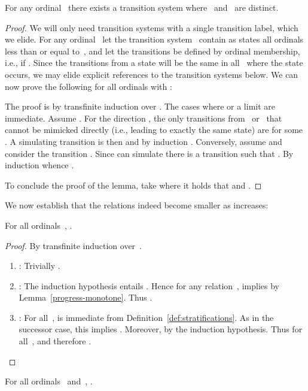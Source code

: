 \documentclass{CSML}
\theoremstyle{definition}
\begin{document}
\begin{lem}
\label{distinct-equivalences}
For any ordinal~ there exists a transition system
where~ and~ are distinct.
\end{lem}

\begin{proof}
We will only need transition systems with a single transition label,
which we elide.  For any ordinal~ let the transition
system~ contain as states all ordinals less than or equal
to~, and let the transitions be defined by ordinal membership,
i.e.,  if . Since the
transitions from a state will be the same in all~ where the
state occurs, we may elide explicit references to the transition
systems below.  We can now prove the following for all ordinals
 with :

The proof is by transfinite induction over .  The cases where
 or a limit are immediate. Assume . For the direction , the only transitions from~
or~ that cannot be mimicked directly (i.e., leading to exactly
the same state) are  for some .  A simulating transition is then  and by induction .
Conversely, assume  and consider the
transition .  Since  can
simulate there is a transition  such
that  . By induction  whence .

To conclude the proof of the lemma, take  where it holds
that  and .
\end{proof}

We now establish that the relations  indeed become
smaller as  increases:

\begin{lem}
\label{stratifications-successor}
For all ordinals~, .
\end{lem}

\begin{proof}
By transfinite induction over~.
\begin{enumerate}
\item : Trivially .
\item : The induction hypothesis entails
  .  Hence for
  any relation~,  implies  by Lemma~\ref{progress-monotone}.
  Thus .
\item : For all~,
   is immediate
  from Definition~\ref{def:stratifications}.  As in the successor
  case, this implies .  Moreover,  by the induction hypothesis.  Thus
   for
  all~, and therefore .\qedhere
\end{enumerate}
\end{proof}

\begin{lem}
\label{stratifications-subset}
For all ordinals~ and~, .
\end{lem}
\end{document}
